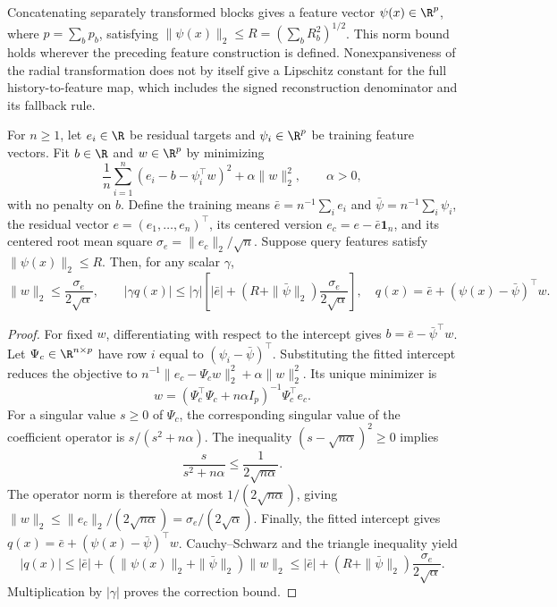 Concatenating separately transformed blocks gives a feature vector
$\psi(x)\in\R^p$, where $p=\sum_b p_b$, satisfying
$\|\psi(x)\|_2\leq R=(\sum_bR_b^2)^{1/2}$. This norm bound holds
wherever the preceding feature construction is defined. Nonexpansiveness
of the radial transformation does not by itself give a Lipschitz constant
for the full history-to-feature map, which includes the signed
reconstruction denominator and its fallback rule.

\begin{proposition}
\label{prop:mechanism-correction-bound}
For $n\geq1$, let $e_i\in\R$ be residual targets and
$\psi_i\in\R^p$ be training feature vectors. Fit $b\in\R$ and
$w\in\R^p$ by minimizing
\[
 \frac1n\sum_{i=1}^n(e_i-b-\psi_i^\top w)^2+\alpha\|w\|_2^2,
 \qquad\alpha>0,
\]
with no penalty on $b$. Define the training means
$\bar e=n^{-1}\sum_i e_i$ and
$\bar\psi=n^{-1}\sum_i\psi_i$, the residual vector
$e=(e_1,\ldots,e_n)^\top$, its centered version
$e_c=e-\bar e\mathbf1_n$, and its centered root mean square
$\sigma_e=\|e_c\|_2/\sqrt n$. Suppose query features satisfy
$\|\psi(x)\|_2\leq R$. Then, for any scalar $\gamma$,
\begin{equation}
 \|w\|_2\leq\frac{\sigma_e}{2\sqrt\alpha},\qquad
 |\gamma q(x)|\leq|\gamma|\left[
 |\bar e|+(R+\|\bar\psi\|_2)\frac{\sigma_e}{2\sqrt\alpha}\right],
 \quad q(x)=\bar e+(\psi(x)-\bar\psi)^\top w.
 \label{eq:mechanism-correction-bound}
\end{equation}
\end{proposition}
\begin{proof}
For fixed $w$, differentiating with respect to the intercept gives
$b=\bar e-\bar\psi^\top w$. Let $\Psi_c\in\R^{n\times p}$ have
row $i$ equal to $(\psi_i-\bar\psi)^\top$. Substituting the fitted
intercept reduces the objective to
$n^{-1}\|e_c-\Psi_cw\|_2^2+\alpha\|w\|_2^2$.
Its unique minimizer is
\[
 w=(\Psi_c^\top\Psi_c+n\alpha I_p)^{-1}\Psi_c^\top e_c.
\]
For a singular value $s\geq0$ of $\Psi_c$, the corresponding singular
value of the coefficient operator is $s/(s^2+n\alpha)$. The inequality
$(s-\sqrt{n\alpha})^2\geq0$ implies
\[
 \frac{s}{s^2+n\alpha}\leq\frac{1}{2\sqrt{n\alpha}}.
\]
The operator norm is therefore at most $1/(2\sqrt{n\alpha})$, giving
$\|w\|_2\leq\|e_c\|_2/(2\sqrt{n\alpha})
=\sigma_e/(2\sqrt\alpha)$. Finally, the fitted intercept gives
$q(x)=\bar e+(\psi(x)-\bar\psi)^\top w$.
Cauchy--Schwarz and the triangle inequality yield
\[
 |q(x)|\leq|\bar e|+
 (\|\psi(x)\|_2+\|\bar\psi\|_2)\|w\|_2
 \leq|\bar e|+(R+\|\bar\psi\|_2)
 \frac{\sigma_e}{2\sqrt\alpha}.
\]
Multiplication by $|\gamma|$ proves the correction bound.
\end{proof}

